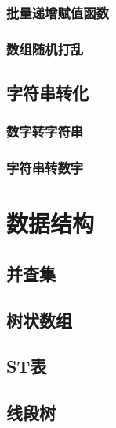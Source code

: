 \documentclass[10pt,a4paper]{article}
\begin{document}
\subsubsection{批量递增赋值函数}

\subsubsection{数组随机打乱}

\subsection{字符串转化}
\subsubsection{数字转字符串}
\begin{spacing}{1.5}

\end{spacing}

\subsubsection{字符串转数字}

\section{数据结构}
\subsection{并查集}
\begin{spacing}{1.5}

\end{spacing}

\subsection{树状数组}

\subsection{ST表}

\subsection{线段树}
\begin{spacing}{1.5}

\end{spacing}

\end{document}
